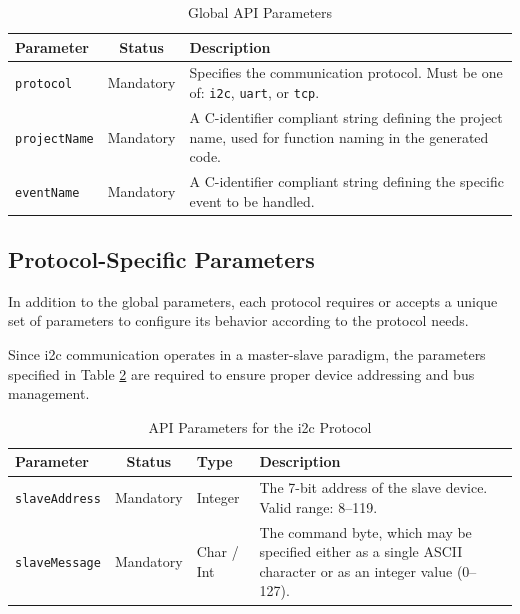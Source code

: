 \begin{table}[h!]
    \centering
    \caption{Global API Parameters}
    \label{tab:global_params}
    \begin{tabular}{|l|c|p{9cm}|}
        \hline
        \textbf{Parameter} & \textbf{Status} & \textbf{Description} \\ \hline
        \texttt{protocol} & Mandatory & Specifies the communication protocol. Must be one of: \texttt{i2c}, \texttt{uart}, or \texttt{tcp}. \\ \hline
        \texttt{projectName} & Mandatory & A C-identifier compliant string defining the project name, used for function naming in the generated code. \\ \hline
        \texttt{eventName} & Mandatory & A C-identifier compliant string defining the specific event to be handled. \\ \hline
    \end{tabular}
\end{table}

\subsection{Protocol-Specific Parameters}
\label{subsec:protocol_params}

In addition to the global parameters, each protocol requires or accepts a unique set of parameters to configure its behavior according to the protocol needs.

Since \gls{i2c} communication operates in a master-slave paradigm, the parameters specified in Table \ref{tab:i2c_params} are required to ensure proper device addressing and bus management.

\begin{table}[h!]
    \centering
    \caption{API Parameters for the \gls{i2c} Protocol}
    \label{tab:i2c_params}
    \begin{tabular}{|l|c|l|p{6cm}|}
        \hline
        \textbf{Parameter} & \textbf{Status} & \textbf{Type} & \textbf{Description} \\ \hline
        \texttt{slaveAddress} & Mandatory & Integer & The 7-bit address of the slave device. Valid range: 8–119. \\ \hline
        \texttt{slaveMessage} & Mandatory & Char / Int & The command byte, which may be specified either as a single ASCII character or as an integer value (0–127). \\ \hline
    \end{tabular}
\end{table}

